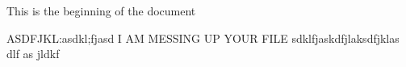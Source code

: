 \documentclass[twocolumn,letterpaper]{IEEEAerospaceCLS}
\begin{document}
 \usepackage{nomencl}%
 \makenomenclature
 
 This is the beginning of the document

    ASDFJKL:asdkl;fjasd
    I AM MESSING UP YOUR FILE
sdklfjaskdfjlaksdfjklas dlf  as jldkf

 
\end{document}
